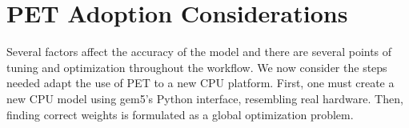 \chapter{PET Adoption Considerations}

Several factors affect the accuracy of the model and there are several points of
tuning and optimization throughout the workflow. We now consider the steps
needed adapt the use of PET to a new CPU platform.  First, one must create a new
CPU model using gem5's Python interface, resembling real hardware. Then, finding
correct weights is formulated as a global optimization problem.







